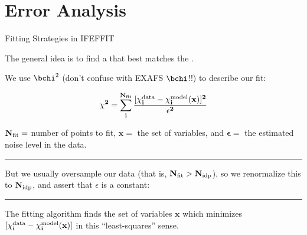 \section{Error Analysis}

\begin{slide}{Fitting Strategies in IFEFFIT }
    

    The general idea is to find a {} that best matches the {}.

    \vmm
    
    We use $\bchi^2$ (don't confuse with EXAFS $\bchi$!!) to describe our
    fit:

    \[ \displaystyle{\mathbf{
        \chi^2  =   \sum_i^{N_{\rm fit}} \frac{[\chi_i^{\rm data} - \chi_i^{\rm
            model}({x})]^2}{\epsilon^2} 
      }} \]

    
    \vmm $\mathbf{N_{\rm fit}} = $ number of points to fit, 
    $\mathbf{x} = $  the set of variables, and $\mathbf{\epsilon} =$ the estimated noise
    level in the data.

    \vmm \hrule \vmm
    
    But we usually oversample our data (that is, $\mathbf{N_{\rm fit} >
      N_{\rm idp} } $), so we renormalize this to $ \mathbf{N_{\rm idp}}$,
    and assert that $\epsilon$ is a constant:

    \begin{center}  
    \end{center}

    \vmm

    \begin{center}
       {}
    \end{center}

    \vmm \hrule \vmm

    \vmm
    
    The fitting algorithm finds the set of variables $\mathbf{x} $ which
    minimizes $[\mathbf{\chi_i^{\rm data} - \chi_i^{\rm model}({x})}]$ in
    this ``least-squares'' sense.


\vfill
\end{slide} 

